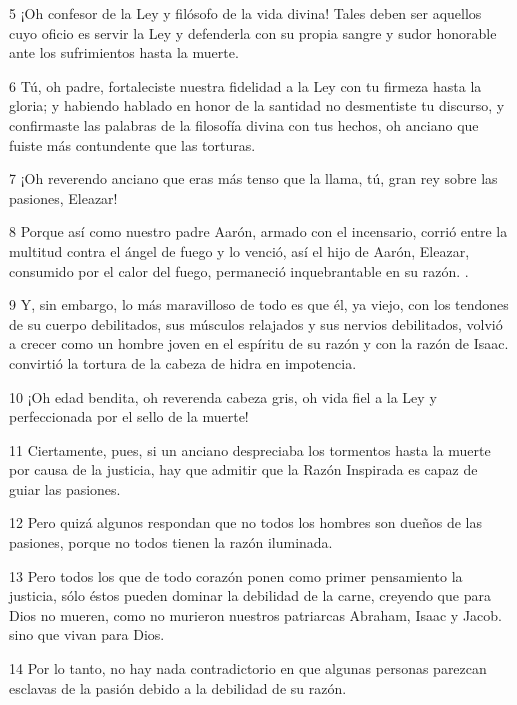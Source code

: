\par 5 ¡Oh confesor de la Ley y filósofo de la vida divina! Tales deben ser aquellos cuyo oficio es servir la Ley y defenderla con su propia sangre y sudor honorable ante los sufrimientos hasta la muerte.

\par 6 Tú, oh padre, fortaleciste nuestra fidelidad a la Ley con tu firmeza hasta la gloria; y habiendo hablado en honor de la santidad no desmentiste tu discurso, y confirmaste las palabras de la filosofía divina con tus hechos, oh anciano que fuiste más contundente que las torturas.

\par 7 ¡Oh reverendo anciano que eras más tenso que la llama, tú, gran rey sobre las pasiones, Eleazar!

\par 8 Porque así como nuestro padre Aarón, armado con el incensario, corrió entre la multitud contra el ángel de fuego y lo venció, así el hijo de Aarón, Eleazar, consumido por el calor del fuego, permaneció inquebrantable en su razón. .

\par 9 Y, sin embargo, lo más maravilloso de todo es que él, ya viejo, con los tendones de su cuerpo debilitados, sus músculos relajados y sus nervios debilitados, volvió a crecer como un hombre joven en el espíritu de su razón y con la razón de Isaac. convirtió la tortura de la cabeza de hidra en impotencia.

\par 10 ¡Oh edad bendita, oh reverenda cabeza gris, oh vida fiel a la Ley y perfeccionada por el sello de la muerte!

\par 11 Ciertamente, pues, si un anciano despreciaba los tormentos hasta la muerte por causa de la justicia, hay que admitir que la Razón Inspirada es capaz de guiar las pasiones.

\par 12 Pero quizá algunos respondan que no todos los hombres son dueños de las pasiones, porque no todos tienen la razón iluminada.

\par 13 Pero todos los que de todo corazón ponen como primer pensamiento la justicia, sólo éstos pueden dominar la debilidad de la carne, creyendo que para Dios no mueren, como no murieron nuestros patriarcas Abraham, Isaac y Jacob. sino que vivan para Dios.

\par 14 Por lo tanto, no hay nada contradictorio en que algunas personas parezcan esclavas de la pasión debido a la debilidad de su razón.

